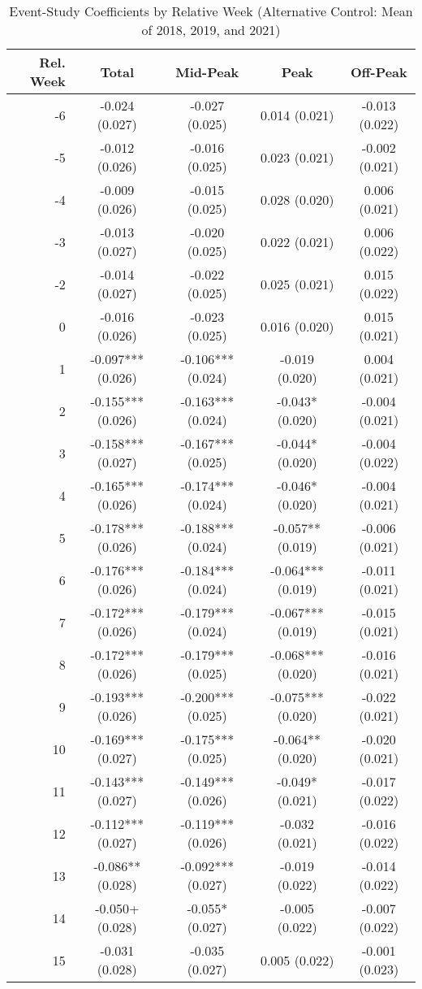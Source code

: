\begin{table}[H]
\centering
\caption{Event-Study Coefficients by Relative Week (Alternative Control: Mean of 2018, 2019, and 2021)}\label{tab:eventstudy_coefs_altcontrol}
\begin{tabular*}{\textwidth}{@{\extracolsep{\fill}}rcccc}
\toprule
Rel. Week & Total & Mid-Peak & Peak & Off-Peak
\\
\midrule
-6 & -0.024 (0.027) & -0.027 (0.025) & 0.014 (0.021) & -0.013 (0.022) \\
-5 & -0.012 (0.026) & -0.016 (0.025) & 0.023 (0.021) & -0.002 (0.021) \\
-4 & -0.009 (0.026) & -0.015 (0.025) & 0.028 (0.020) & 0.006 (0.021) \\
-3 & -0.013 (0.027) & -0.020 (0.025) & 0.022 (0.021) & 0.006 (0.022) \\
-2 & -0.014 (0.027) & -0.022 (0.025) & 0.025 (0.021) & 0.015 (0.022) \\
 0 & -0.016 (0.026) & -0.023 (0.025) & 0.016 (0.020) & 0.015 (0.021) \\
 1 & -0.097*** (0.026) & -0.106*** (0.024) & -0.019 (0.020) & 0.004 (0.021) \\
 2 & -0.155*** (0.026) & -0.163*** (0.024) & -0.043* (0.020) & -0.004 (0.021) \\
 3 & -0.158*** (0.027) & -0.167*** (0.025) & -0.044* (0.020) & -0.004 (0.022) \\
 4 & -0.165*** (0.026) & -0.174*** (0.024) & -0.046* (0.020) & -0.004 (0.021) \\
 5 & -0.178*** (0.026) & -0.188*** (0.024) & -0.057** (0.019) & -0.006 (0.021) \\
 6 & -0.176*** (0.026) & -0.184*** (0.024) & -0.064*** (0.019) & -0.011 (0.021) \\
 7 & -0.172*** (0.026) & -0.179*** (0.024) & -0.067*** (0.019) & -0.015 (0.021) \\
 8 & -0.172*** (0.026) & -0.179*** (0.025) & -0.068*** (0.020) & -0.016 (0.021) \\
 9 & -0.193*** (0.026) & -0.200*** (0.025) & -0.075*** (0.020) & -0.022 (0.021) \\
10 & -0.169*** (0.027) & -0.175*** (0.025) & -0.064** (0.020) & -0.020 (0.021) \\
11 & -0.143*** (0.027) & -0.149*** (0.026) & -0.049* (0.021) & -0.017 (0.022) \\
12 & -0.112*** (0.027) & -0.119*** (0.026) & -0.032 (0.021) & -0.016 (0.022) \\
13 & -0.086** (0.028) & -0.092*** (0.027) & -0.019 (0.022) & -0.014 (0.022) \\
14 & -0.050+ (0.028) & -0.055* (0.027) & -0.005 (0.022) & -0.007 (0.022) \\
15 & -0.031 (0.028) & -0.035 (0.027) & 0.005 (0.022) & -0.001 (0.023)
\bottomrule
\midrule
\multicolumn{5}{l}{\rule{0pt}{1em}+ p $<$ 0.1, * p $<$ 0.05, ** p $<$ 0.01, *** p $<$ 0.001}\\
\end{tabular*}
\end{table}
